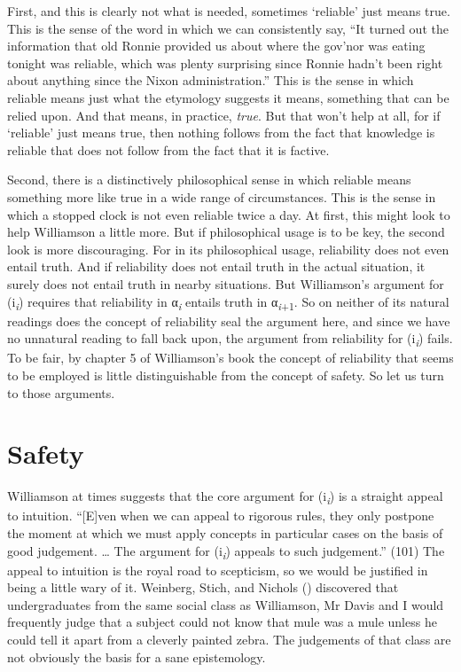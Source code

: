 \documentclass[
  11pt,
  letterpaper,
  DIV=11,
  numbers=noendperiod,
  twoside]{scrartcl}
\renewcommand{\textsc}[1]{{\scfont #1}}
\begin{document}
First, and this is clearly not what is needed, sometimes `reliable' just
means true. This is the sense of the word in which we can consistently
say, ``It turned out the information that old Ronnie provided us about
where the gov'nor was eating tonight was reliable, which was plenty
surprising since Ronnie hadn't been right about anything since the Nixon
administration.'' This is the sense in which reliable means just what
the etymology suggests it means, something that can be relied upon. And
that means, in practice, \emph{true}. But that won't help at all, for if
`reliable' just means true, then nothing follows from the fact that
knowledge is reliable that does not follow from the fact that it is
factive.

Second, there is a distinctively philosophical sense in which reliable
means something more like true in a wide range of circumstances. This is
the sense in which a stopped clock is not even reliable twice a day. At
first, this might look to help Williamson a little more. But if
philosophical usage is to be key, the second look is more discouraging.
For in its philosophical usage, reliability does not even entail truth.
And if reliability does not entail truth in the actual situation, it
surely does not entail truth in nearby situations. But Williamson's
argument for (\textsc{i}\textsubscript{\emph{i}}) requires that
reliability in α\textsubscript{\emph{i}} entails truth in
α\textsubscript{\emph{i}+1}. So on neither of its natural readings does
the concept of reliability seal the argument here, and since we have no
unnatural reading to fall back upon, the argument from reliability for
(\textsc{i}\textsubscript{\emph{i}}) fails. To be fair, by chapter 5 of
Williamson's book the concept of reliability that seems to be employed
is little distinguishable from the concept of safety. So let us turn to
those arguments.

\section{Safety}\label{safety}

Williamson at times suggests that the core argument for
(\textsc{i}\textsubscript{\emph{i}}) is a straight appeal to intuition.
``{[}E{]}ven when we can appeal to rigorous rules, they only postpone
the moment at which we must apply concepts in particular cases on the
basis of good judgement. \ldots{} The argument for
(\textsc{i}\textsubscript{\emph{i}}) appeals to such judgement.'' (101)
The appeal to intuition is the royal road to scepticism, so we would be
justified in being a little wary of it. Weinberg, Stich, and Nichols
() discovered that undergraduates from
the same social class as Williamson, Mr Davis and I would frequently
judge that a subject could not know that mule was a mule unless he could
tell it apart from a cleverly painted zebra. The judgements of that
class are not obviously the basis for a sane epistemology.
\end{document}

